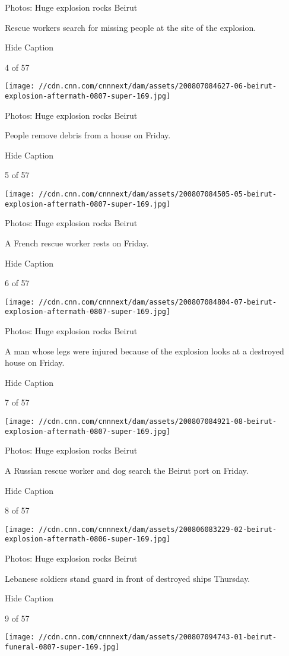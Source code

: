 Photos: Huge explosion rocks Beirut

Rescue workers search for missing people at the site of the explosion.

Hide Caption

4 of 57

\texttt{[image: //cdn.cnn.com/cnnnext/dam/assets/200807084627-06-beirut-explosion-aftermath-0807-super-169.jpg]}

Photos: Huge explosion rocks Beirut

People remove debris from a house on Friday.

Hide Caption

5 of 57

\texttt{[image: //cdn.cnn.com/cnnnext/dam/assets/200807084505-05-beirut-explosion-aftermath-0807-super-169.jpg]}

Photos: Huge explosion rocks Beirut

A French rescue worker rests on Friday.

Hide Caption

6 of 57

\texttt{[image: //cdn.cnn.com/cnnnext/dam/assets/200807084804-07-beirut-explosion-aftermath-0807-super-169.jpg]}

Photos: Huge explosion rocks Beirut

A man whose legs were injured because of the explosion looks at a
destroyed house on Friday.

Hide Caption

7 of 57

\texttt{[image: //cdn.cnn.com/cnnnext/dam/assets/200807084921-08-beirut-explosion-aftermath-0807-super-169.jpg]}

Photos: Huge explosion rocks Beirut

A Russian rescue worker and dog search the Beirut port on Friday.

Hide Caption

8 of 57

\texttt{[image: //cdn.cnn.com/cnnnext/dam/assets/200806083229-02-beirut-explosion-aftermath-0806-super-169.jpg]}

Photos: Huge explosion rocks Beirut

Lebanese soldiers stand guard in front of destroyed ships Thursday.

Hide Caption

9 of 57

\texttt{[image: //cdn.cnn.com/cnnnext/dam/assets/200807094743-01-beirut-funeral-0807-super-169.jpg]}

